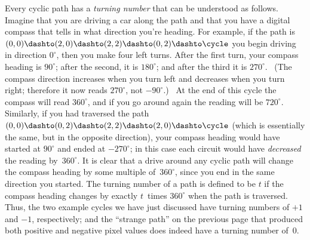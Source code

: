 {{{{\danger Every cyclic path has a {\sl turning number\/} that can be understood
as follows. Imagine that you are driving a car along the path and that you
have a digital compass that tells in what direction you're heading. For
example, if the path is
\begindisplay
$(0,0)\dashto(2,0)\dashto(2,2)\dashto(0,2)\dashto\cycle$
\enddisplay
you begin driving in direction $0^\circ$, then you make four left turns.
After the first turn, your compass heading is $90^\circ$; after the
second, it is $180^\circ$; and after the third it is $270^\circ$. \ (The
compass direction increases when you turn left and decreases when you turn
right; therefore it now reads $270^\circ$, not $-90^\circ$.) \ At the
end of this cycle the compass will read $360^\circ$, and if you go around
again the reading will be $720^\circ$. Similarly, if you had traversed the
path
\begindisplay
$(0,0)\dashto(0,2)\dashto(2,2)\dashto(2,0)\dashto\cycle$
\enddisplay
(which is essentially the same, but in the opposite direction), your compass
heading would have started at $90^\circ$ and ended at $-270^\circ$;
in this case each circuit would have {\sl decreased\/} the reading
by~$360^\circ$. It is clear that a drive around any cyclic path will
change the compass heading by some multiple of~$360^\circ$, since you
end in the same direction you started. The turning number of a path is
defined to be $t$ if the compass heading changes by exactly $t$~times
$360^\circ$ when the path is traversed. Thus, the two example cycles we have
just discussed have turning numbers of $+1$ and $-1$, respectively; and
the ``strange path'' on the previous page that produced both positive and
negative pixel values does indeed have a turning number of~0.

}}}}
